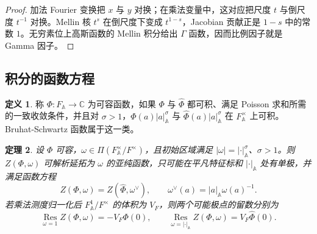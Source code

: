 \documentclass[11pt,a4paper,openany]{ctexbook}
\numberwithin{equation}{chapter}
\newcommand{\C}{\mathbb{C}}
\newcommand{\A}{\mathbb{A}}
\theoremstyle{plain}
\newtheorem{theorem}{定理}[chapter]
\theoremstyle{definition}
\newtheorem{definition}[theorem]{定义}
\theoremstyle{remark}
\begin{document}
\begin{proof}
加法 Fourier 变换把 $x$ 与 $y$ 对换；在乘法变量中，这对应把尺度 $t$ 与倒尺度 $t^{-1}$ 对换。Mellin 核 $t^s$ 在倒尺度下变成 $t^{1-s}$，Jacobian 贡献正是 $1-s$ 中的常数 $1$。无穷素位上高斯函数的 Mellin 积分给出 $\Gamma$ 函数，因而比例因子就是 Gamma 因子。
\end{proof}

\subsection{积分的函数方程}

\begin{definition}
称 $\Phi:F_{\A}\to\C$ 为可容函数，如果 $\Phi$ 与 $\widehat\Phi$ 都可积、满足 Poisson 求和所需的一致收敛条件，并且对 $\sigma>1$，$\Phi(a)|a|_{\A}^{\sigma}$ 与 $\widehat\Phi(a)|a|_{\A}^{\sigma}$ 在 $F_{\A}^{\times}$ 上可积。Bruhat-Schwartz 函数属于这一类。
\end{definition}

\begin{theorem}
设 $\Phi$ 可容，$\omega\in\Pi(F_{\A}^{\times}/F^\times)$，且初始区域满足 $|\omega|=|\cdot|_{\A}^{\sigma}$、$\sigma>1$。则 $Z(\Phi,\omega)$ 可解析延拓为 $\omega$ 的亚纯函数，只可能在平凡特征标和 $|\cdot|_{\A}$ 处有单极，并满足函数方程
\[
  Z(\Phi,\omega)=Z(\widehat\Phi,\omega^\vee),
\qquad
  \omega^\vee(a)=|a|_{\A}\omega(a)^{-1}.
\]
若乘法测度归一化后 $F_{\A}^{1}/F^\times$ 的体积为 $V_F$，则两个可能极点的留数分别为
\[
  \operatorname*{Res}_{\omega=1}Z(\Phi,\omega)=-V_F\Phi(0),
  \qquad
  \operatorname*{Res}_{\omega=|\cdot|_{\A}}Z(\Phi,\omega)=V_F\widehat\Phi(0).
\]
\end{theorem}
\end{document}
